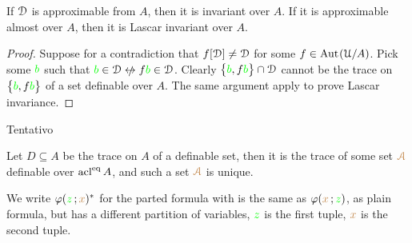 \documentclass[creche.tex]{subfiles}
\begin{document}
\begin{proposition}
If\/ $\EuScript D$ is\/ approximable from $A$, then it is invariant over $A$. If it is\/ ap\-prox\-i\-ma\-ble almost over $A$, then it is Lascar invariant over $A$.
\end{proposition}

\begin{proof}
Suppose for a contradiction that $f[\EuScript D]\neq\EuScript D$ for some $f\in\textrm{Aut\kern.15ex}(\EuScript U/A)$. Pick some ${\color{green} b}$ such that ${\gr b}\in\D\niff f{\gr b}\in\D$. Clearly $\big\{{\color{green} b},f{\color{green} b}\big\}\cap\EuScript D$ cannot be the trace on $\big\{{\color{green} b},f{\color{green} b}\big\}$ of a set definable over $A$. The same argument apply to prove Lascar invariance.
\end{proof}

Tentativo

Let $D\subseteq A$ be the trace on $A$ of a definable set, then it is the trace of some set ${\color{brown}{\EuScript A}}$ definable over $\mathop{\rm acl}^{{\rm eq}} A$, and such a set ${\color{brown}{\EuScript A}}$ is unique.

We write $\varphi({\color{green} z}\,;{\color{brown} x})^*$ for the parted formula with is the same as $\varphi({\color{brown} x}\,;{\color{green} z})$, as plain formula, but has a different partition of variables, ${\color{green} z}$ is the first tuple, ${\color{brown} x}$ is the second tuple.
\end{document}
